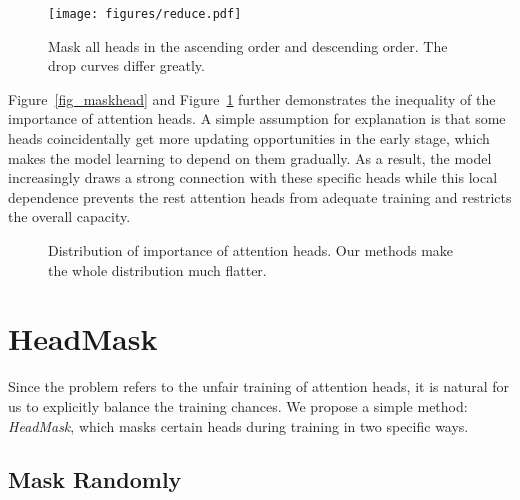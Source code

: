 \documentclass[11pt]{article}
\begin{document}
\begin{figure}[h]
    \centering
    \texttt{[image: figures/reduce.pdf]}
    \caption{Mask all heads in the ascending order and descending order. The drop curves differ greatly.} 
    \label{fig_reduce}
\end{figure}

Figure~\ref{fig_maskhead} and Figure~\ref{fig_reduce} further demonstrates the inequality of the importance of attention heads. 
A simple assumption for explanation is that some heads coincidentally get more updating opportunities in the early stage, which makes the model learning to depend on them gradually. 
As a result, the model increasingly draws a strong connection with these specific heads while this local dependence prevents the rest attention heads from adequate training and restricts the overall capacity. 



\begin{figure*}[b!]\footnotesize
    \centering
    \caption{Distribution of importance of attention heads. Our methods make the whole distribution much flatter.}
    \label{fig_maskhead_dis}
\end{figure*}

\section{HeadMask}

Since the problem refers to the unfair training of attention heads, it is natural for us to explicitly balance the training chances. We propose a simple method: \textit{HeadMask}, which masks certain heads during training in two specific ways.

\subsection{Mask Randomly}
\end{document}
